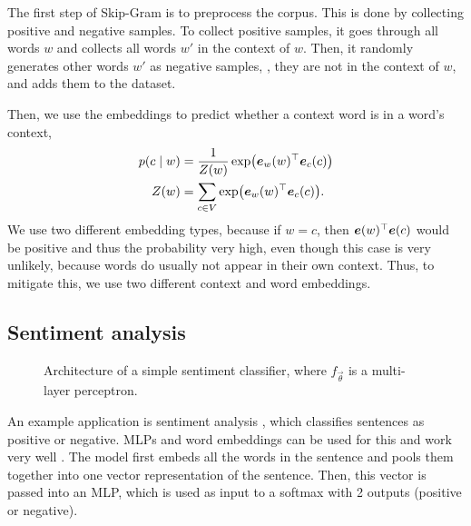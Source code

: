 The first step of Skip-Gram is to preprocess the corpus. This is done by
collecting positive and negative samples. To collect positive samples,
it goes through all words $w$ and collects all words $w'$ in the context of
$w$. Then, it randomly generates other words $w'$ as negative samples, \ie,
they are not in the context of $w$, and adds them to the dataset.

Then, we use the embeddings to predict whether a context word is in a word's
context,
\begin{align*}
  p(c\mid w) &= \frac{1}{Z(w)} \exp \lft( \transpose{\vec{e}_w(w)} \vec{e}_c(c) \rgt) \\
  Z(w) &= \sum_{c \in V} \exp \lft( \transpose{\vec{e}_w(w)} \vec{e}_c(c) \rgt)
.\end{align*}
We use two different embedding types, because if $w=c$, then
$\bm{e}(w)^\top \bm{e}(c)$ would be positive and thus the probability
very high, even though this case is very unlikely, because words do usually not
appear in their own context. Thus, to mitigate this, we use two different
context and word embeddings.

\subsection{Sentiment analysis}

\begin{figure}[h!]
    \centering
    \caption{Architecture of a simple sentiment classifier, where
    $f_{\vec{\theta}}$ is a multi-layer perceptron.}
    \label{fig:sentiment-analysis}
\end{figure}

An example application is sentiment analysis \citep{pang2008opinion}, which
classifies sentences as positive or negative. MLPs and word embeddings can be
used for this and work very well \citep{iyyer2015deep}. The model first embeds
all the words in the sentence and pools them together into one vector
representation of the sentence. Then, this vector is
passed into an MLP, which is used as input to a softmax with 2 outputs
(positive or negative).
